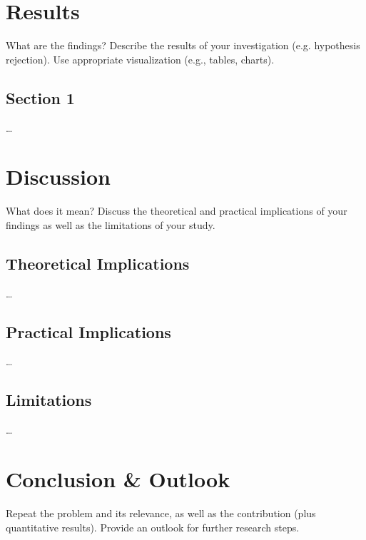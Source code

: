 \documentclass{thesisclass}
\begin{document}
\chapter{Results} What are the findings? Describe the results of your investigation (e.g. hypothesis rejection). Use appropriate visualization (e.g., tables, charts).
\section{Section 1}\dots

\chapter{Discussion} What does it mean? Discuss the theoretical and practical implications of your findings as well as the limitations of your study.
\section{Theoretical Implications}\dots
\section{Practical Implications}\dots
\section{Limitations}\dots

\chapter{Conclusion \& Outlook} Repeat the problem and its relevance, as well as the contribution (plus quantitative results). Provide an outlook for further research steps.





 




{}
{}




												  


\end{document}
